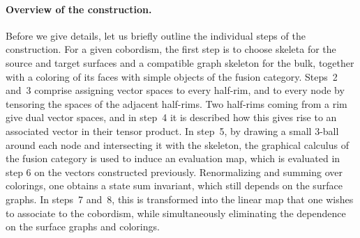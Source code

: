 \documentclass[pdftex]{sigma}
\numberwithin{equation}{section}
\theoremstyle{definition}
\begin{document}
\paragraph{Overview of the construction.} Before we give details, let us briefly outline the individual steps of the construction. For a given cobordism, the first step is to choose skeleta for the source and target surfaces and a compatible graph skeleton for the bulk, together with a coloring of its faces with simple objects of the fusion category. Steps~2 and~3 comprise assigning vector spaces to every half-rim, and to every node by tensoring the spaces of the adjacent half-rims. Two half-rims coming from a rim give dual vector spaces, and in step~4 it is described how this gives rise to an associated vector in their tensor product. In step~5, by drawing a small 3-ball around each node and intersecting it with the skeleton, the graphical calculus of the fusion category is used to induce an evaluation map, which is evaluated in step 6 on the vectors constructed previously. Renormalizing and summing over colorings, one obtains a state sum invariant, which still depends on the surface graphs. In steps~7 and~8, this is transformed into the linear map that one wishes to associate to the cobordism, while simultaneously eliminating the dependence on the surface graphs and colorings.
\end{document}
